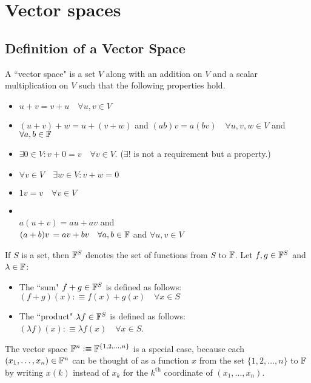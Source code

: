 \chapter{Vector spaces}

\section{Definition of a Vector Space}

\setcounter{thm}{19}
\begin{mydef}
    A ``vector space" is a set $V$ along with an addition on $V$ and a scalar multiplication on $V$ such that the following properties hold.
    \begin{itemize}
        \item {} 
        $ u+v = v+u \quad \forall u,v \in V$
        \item {} 
        $(u+v)+w=u+(v+w)$ and $(ab)v=a(bv) \quad \forall u,v,w \in V$ and $\forall a,b \in \mathbb{F}$
        \item {} 
        $\exists 0\in V:v+0=v \quad \forall v\in V$. ($\exists!$ is not a requirement but a property.)
        \item {} 
        $\forall v\in V \quad \exists w\in V: v+w=0$
        \item {} 
        $1v = v \quad \forall v\in V$
        \item {}\\
        $a(u+v) = au+av$ and  \\
        $(a+b)v \, = av + bv \quad \forall a,b \in \mathbb{F}$ and 
        $\forall u,v \in V$
    \end{itemize}
\end{mydef}

\setcounter{thm}{23}
\begin{mydef}
    If $S$ is a set, then $\mathbb{F}^S$ denotes the set of functions from $S$ to $\mathbb{F}$. Let $f, g \in \mathbb{F}^{S}$ and $\lambda \in \mathbb{F}$:
    \begin{itemize}
        \item The ``sum" $f+g \in \mathbb{F}^{S}$ is defined as follows: $(f+g)(x) :\equiv f(x)+ g(x) \quad \forall x\in S$
        \item The ``product" $\lambda f \in \mathbb{F}^{S}$ is defined as follows: $(\lambda f)(x) :\equiv \lambda f(x) \quad \forall x \in S$.
    \end{itemize}
    The vector space $\mathbb{F}^{n} :\equiv \mathbb{F}^{\{1,2,\dots,n\}}$ is a special case, because each $(x_1, \dots, x_n) \in \mathbb{F}^{n}$ can be thought of as a function $x$ from the set $\{1, 2, \dots, n\}$ to $\mathbb{F}$ by writing $x(k)$ instead of $x_k$ for the $k^{\text{th}}$ coordinate of $(x_1, \dots, x_n)$.
\end{mydef}

